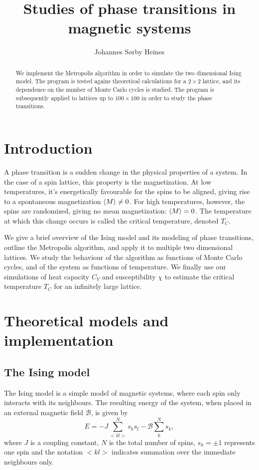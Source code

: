 \documentclass[a4paper,10pt,onecolumn]{article}
\title{Studies of phase transitions in magnetic systems}
\author{Johannes Sørby Heines}
\begin{document}
\maketitle
\begin{abstract}
We implement the Metropolis algorithm in order to simulate the two dimensional Ising model. The program is tested agains theoretical calculations for a $2\times2$ lattice, and its dependence on the number of Monte Carlo cycles is studied. The program is subsequently applied to lattices up to $100\times100$ in order to study the phase transitions. 
\end{abstract}

\section{Introduction}

A phase transition is a sudden change in the physical properties of a system. In the case of a spin lattice, this property is the magnetization. At low temperatures, it's energetically favourable for the spins to be aligned, giving rise to a spontaneous magnetization $\expval{M}\neq0$. For high temperatures, however, the spins are randomized, giving no mean magnetization: $\expval{M} = 0$. The temperature at which this change occurs is called the critical temperature, denoted $T_C$.

We give a brief overview of the Ising model and its modeling of phase transitions, outline the Metropolis algorithm, and apply it to multiple two dimensional lattices.
We study the behaviour of the algorithm as functions of Monte Carlo cycles, and of the system as functions of temperature.
We finally use our simulations of heat capacity $C_V$ and susceptibility  $\chi$ to estimate the critical temperature $T_C$ for an infinitely large lattice.  

%
%
%
\section{Theoretical models and implementation}

\subsection{The Ising model}\label{sec:ising}

The Ising model is a simple model of magnetic systems, where each spin only interacts with its neighbours. The resulting energy of the system, when placed in an external magnetic field $\mathcal{B}$, is given by
\begin{equation}\label{eq:ising}
E = -J \sum_{<kl>}^Ns_ks_l - \mathcal{B}\sum_{k}^Ns_k,
\end{equation}
where $J$ is a coupling constant, $N$ is the total number of spins, $s_k = \pm1$ represents one spin and the notation $<kl>$ indicates summation over the immediate neighbours only. 
\end{document}
